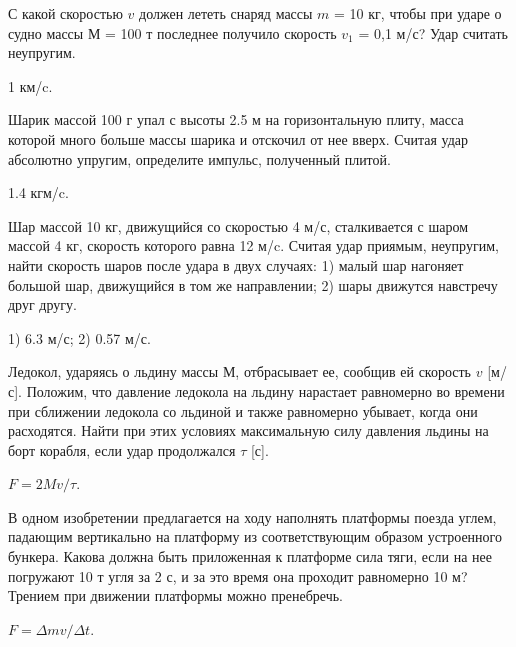 \simpleProblems

\begin{ex} %
С какой скоростью $v$ должен лететь снаряд массы $m$ = 10 кг, чтобы при ударе о судно массы $М$ = 100 т последнее получило скорость $v_1$ = 0,1 м/с? Удар считать неупругим.
\begin{ans}
1 км/c.
\end{ans}
\end{ex}

\begin{ex} %
Шарик  массой 100 г упал с высоты 2.5 м на горизонтальную плиту, масса которой много больше массы шарика и отскочил от нее вверх. Считая удар абсолютно упругим, определите импульс, полученный плитой.
\begin{ans}
1.4 кгм/c.
\end{ans}
\end{ex}

\begin{ex} %
Шар массой 10 кг, движущийся со скоростью 4 м/с, сталкивается с шаром массой 4 кг, скорость которого равна 12 м/c. Считая удар приямым, неупругим, найти скорость шаров после удара в двух случаях: 1) малый шар нагоняет большой шар, движущийся в том же направлении; 2) шары движутся навстречу друг другу.
\begin{ans}
1) 6.3 м/с; 2) 0.57 м/с.
\end{ans}
\end{ex}


\begin{ex} %
Ледокол, ударяясь о льдину массы $М$, отбрасывает ее, сообщив ей скорость $v$ [м/с]. Положим, что давление ледокола на льдину нарастает равномерно во времени при сближении ледокола со льдиной и также равномерно убывает, когда они расходятся. Найти при этих условиях максимальную силу давления льдины на борт корабля, если удар продолжался $\tau$ [с].
\begin{ans}
$F = 2Mv/\tau$.
\end{ans}
\end{ex}

\begin{ex} %
В одном изобретении предлагается на ходу наполнять платформы поезда углем, падающим вертикально на платформу из соответствующим образом устроенного бункера. Какова должна быть приложенная к платформе сила тяги, если на нее погружают 10 т угля за 2 с, и за это время она проходит равномерно 10 м? Трением при движении платформы можно пренебречь.
\begin{ans}
$F = \Delta m v/ \Delta t$.
\end{ans}
\end{ex}

